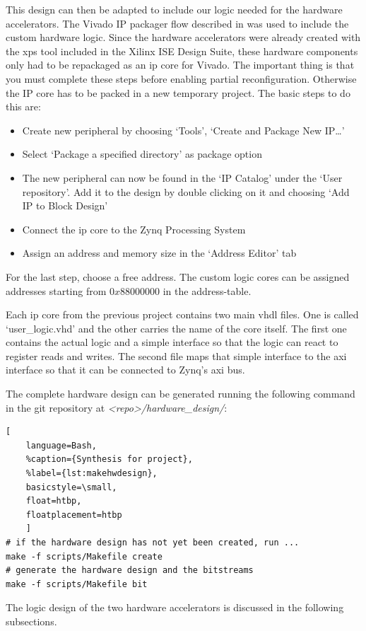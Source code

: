 This design can then be adapted to include our logic needed for the hardware accelerators. The Vivado IP packager flow described in \cite{UG1118} was used to include the custom hardware logic. Since the hardware accelerators were already created with the \gls{xps} tool included in the Xilinx ISE Design Suite, these hardware components only had to be repackaged as an \gls{ip} core for Vivado. The important thing is that you must complete these steps before enabling partial reconfiguration.  Otherwise the IP core has to be packed in a new temporary project.
The basic steps to do this are:
\begin{itemize}
	\item Create new peripheral by choosing `Tools', `Create and Package New IP\ldots'
	\item Select `Package a specified directory' as package option
	\item The new peripheral can now be found in the `IP Catalog'
		under the `User repository'.
		Add it to the design by double clicking on it and choosing `Add IP to Block Design'
	\item Connect the \gls{ip} core to the Zynq Processing System
	\item Assign an address and memory size in the `Address Editor' tab
\end{itemize}
For the last step, choose a free address.
The custom logic cores can be assigned addresses starting from $0x88000000$ in the address-table.

Each \gls{ip} core from the previous project contains two main \gls{vhdl} files.
One is called `user\_logic.vhd' and the other carries the name of the core
itself.
The first one contains the actual logic and a simple interface so that the logic can react to register reads and writes.
The second file maps that simple interface to the \gls{axi} interface so that it can be connected to Zynq's \gls{axi} bus.

The complete hardware design can be generated running the following command in the git repository at \emph{<repo>/hardware\_design/}:

\begin{lstlisting}[
	language=Bash,
	%caption={Synthesis for project},
	%label={lst:makehwdesign},
	basicstyle=\small,
	float=htbp,
	floatplacement=htbp
	]
# if the hardware design has not yet been created, run ...
make -f scripts/Makefile create
# generate the hardware design and the bitstreams
make -f scripts/Makefile bit
\end{lstlisting}

The logic design of the two hardware accelerators is discussed in the following
subsections.
